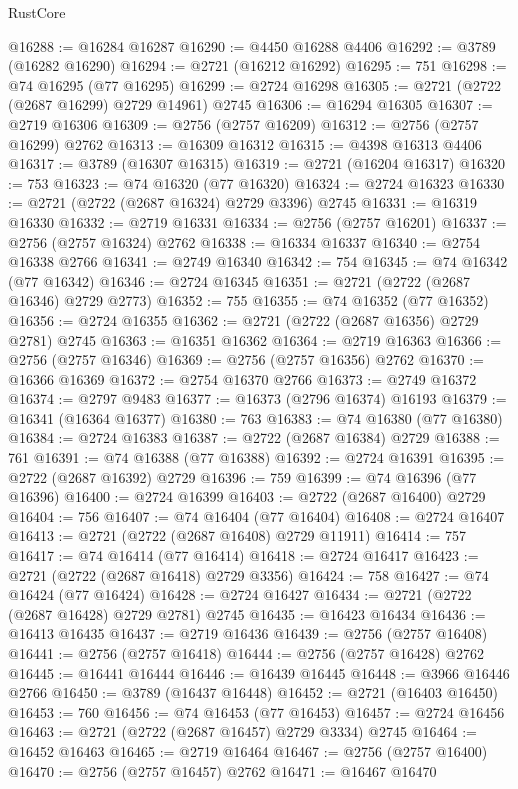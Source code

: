 \begin{lexlean}{RustCore}
\begin{coremodule}
@16288 := @16284 @16287
@16290 := @4450 @16288 @4406
@16292 := @3789 (@16282 @16290)
@16294 := @2721 (@16212 @16292)
@16295 := 751
@16298 := @74 @16295 (@77 @16295)
@16299 := @2724 @16298
@16305 := @2721 (@2722 (@2687 @16299) @2729 @14961) @2745
@16306 := @16294 @16305
@16307 := @2719 @16306
@16309 := @2756 (@2757 @16209)
@16312 := @2756 (@2757 @16299) @2762
@16313 := @16309 @16312
@16315 := @4398 @16313 @4406
@16317 := @3789 (@16307 @16315)
@16319 := @2721 (@16204 @16317)
@16320 := 753
@16323 := @74 @16320 (@77 @16320)
@16324 := @2724 @16323
@16330 := @2721 (@2722 (@2687 @16324) @2729 @3396) @2745
@16331 := @16319 @16330
@16332 := @2719 @16331
@16334 := @2756 (@2757 @16201)
@16337 := @2756 (@2757 @16324) @2762
@16338 := @16334 @16337
@16340 := @2754 @16338 @2766
@16341 := @2749 @16340
@16342 := 754
@16345 := @74 @16342 (@77 @16342)
@16346 := @2724 @16345
@16351 := @2721 (@2722 (@2687 @16346) @2729 @2773)
@16352 := 755
@16355 := @74 @16352 (@77 @16352)
@16356 := @2724 @16355
@16362 := @2721 (@2722 (@2687 @16356) @2729 @2781) @2745
@16363 := @16351 @16362
@16364 := @2719 @16363
@16366 := @2756 (@2757 @16346)
@16369 := @2756 (@2757 @16356) @2762
@16370 := @16366 @16369
@16372 := @2754 @16370 @2766
@16373 := @2749 @16372
@16374 := @2797 @9483
@16377 := @16373 (@2796 @16374) @16193
@16379 := @16341 (@16364 @16377)
@16380 := 763
@16383 := @74 @16380 (@77 @16380)
@16384 := @2724 @16383
@16387 := @2722 (@2687 @16384) @2729
@16388 := 761
@16391 := @74 @16388 (@77 @16388)
@16392 := @2724 @16391
@16395 := @2722 (@2687 @16392) @2729
@16396 := 759
@16399 := @74 @16396 (@77 @16396)
@16400 := @2724 @16399
@16403 := @2722 (@2687 @16400) @2729
@16404 := 756
@16407 := @74 @16404 (@77 @16404)
@16408 := @2724 @16407
@16413 := @2721 (@2722 (@2687 @16408) @2729 @11911)
@16414 := 757
@16417 := @74 @16414 (@77 @16414)
@16418 := @2724 @16417
@16423 := @2721 (@2722 (@2687 @16418) @2729 @3356)
@16424 := 758
@16427 := @74 @16424 (@77 @16424)
@16428 := @2724 @16427
@16434 := @2721 (@2722 (@2687 @16428) @2729 @2781) @2745
@16435 := @16423 @16434
@16436 := @16413 @16435
@16437 := @2719 @16436
@16439 := @2756 (@2757 @16408)
@16441 := @2756 (@2757 @16418)
@16444 := @2756 (@2757 @16428) @2762
@16445 := @16441 @16444
@16446 := @16439 @16445
@16448 := @3966 @16446 @2766
@16450 := @3789 (@16437 @16448)
@16452 := @2721 (@16403 @16450)
@16453 := 760
@16456 := @74 @16453 (@77 @16453)
@16457 := @2724 @16456
@16463 := @2721 (@2722 (@2687 @16457) @2729 @3334) @2745
@16464 := @16452 @16463
@16465 := @2719 @16464
@16467 := @2756 (@2757 @16400)
@16470 := @2756 (@2757 @16457) @2762
@16471 := @16467 @16470

\end{coremodule}
\end{lexlean}
